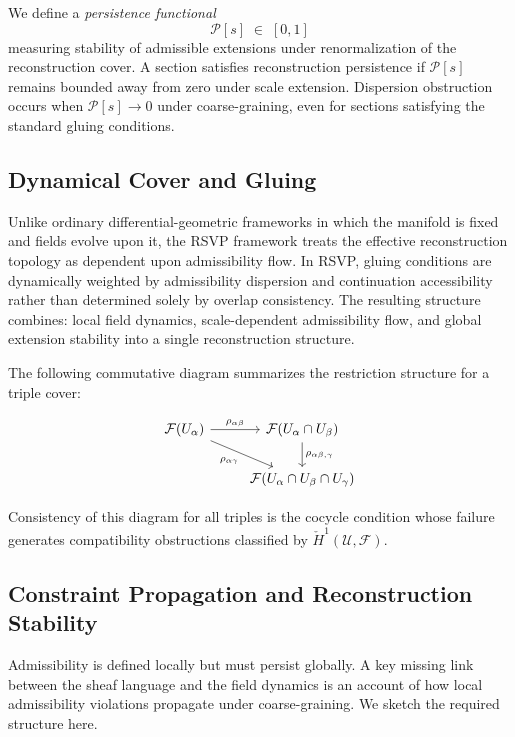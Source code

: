 \documentclass[11pt, a4paper]{article}
\theoremstyle{plain}
\theoremstyle{definition}
\theoremstyle{remark}
\newcommand{\sheaf}{\mathcal{F}}
\newcommand{\Ucover}{\mathcal{U}}
\newcommand{\Hcech}{\check{H}}
\begin{document}
We define a \emph{persistence functional}
\[
  \mathcal{P}[s] \;\in\; [0,1]
\]
measuring stability of admissible extensions under renormalization of the
reconstruction cover. A section satisfies reconstruction persistence if
$\mathcal{P}[s]$ remains bounded away from zero under scale extension. Dispersion
obstruction occurs when $\mathcal{P}[s] \to 0$ under coarse-graining, even for
sections satisfying the standard gluing conditions.

\subsection{Dynamical Cover and Gluing}

Unlike ordinary differential-geometric frameworks in which the manifold is fixed and
fields evolve upon it, the RSVP framework treats the effective reconstruction
topology as dependent upon admissibility flow. In RSVP, gluing conditions are
dynamically weighted by admissibility dispersion and continuation accessibility
rather than determined solely by overlap consistency. The resulting structure combines:
local field dynamics, scale-dependent admissibility flow, and global extension
stability into a single reconstruction structure.

The following commutative diagram summarizes the restriction structure for a triple
cover:

\[
\begin{tikzcd}
\sheaf(U_\alpha) \arrow[r, "\rho_{\alpha\beta}"] \arrow[dr, "\rho_{\alpha\gamma}"']
  & \sheaf(U_\alpha \cap U_\beta) \arrow[d, "\rho_{\alpha\beta,\gamma}"] \\
  & \sheaf(U_\alpha \cap U_\beta \cap U_\gamma)
\end{tikzcd}
\]

Consistency of this diagram for all triples is the cocycle condition whose failure
generates compatibility obstructions classified by $\Hcech^1(\Ucover, \sheaf)$.

\subsection{Constraint Propagation and Reconstruction Stability}
\label{app:constraint-prop}

Admissibility is defined locally but must persist globally. A key missing link between
the sheaf language and the field dynamics is an account of how local admissibility
violations propagate under coarse-graining. We sketch the required structure here.
\end{document}
